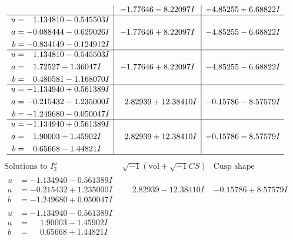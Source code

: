 \documentclass[1p]{elsarticle_modified}
\theoremstyle{definition}
\newcommand{\I}{\sqrt{-1}}
\begin{document}
$$\begin{array}{c|c|c}
 & -1.77646 - 8.22097 I & -4.85255 + 6.68822 I \\ \hline\begin{aligned}
u &= \phantom{-}1.134810 - 0.545503 I \\
a &= -0.088444 - 0.629026 I \\
b &= -0.834149 - 0.124912 I\end{aligned}
 & -1.77646 + 8.22097 I & -4.85255 - 6.68822 I \\ \hline\begin{aligned}
u &= \phantom{-}1.134810 - 0.545503 I \\
a &= \phantom{-}1.72527 + 1.36047 I \\
b &= \phantom{-}0.480581 - 1.168070 I\end{aligned}
 & -1.77646 + 8.22097 I & -4.85255 - 6.68822 I \\ \hline\begin{aligned}
u &= -1.134940 + 0.561389 I \\
a &= -0.215432 - 1.235000 I \\
b &= -1.249680 - 0.050047 I\end{aligned}
 & \phantom{-}2.82939 + 12.38410 I & -0.15786 - 8.57579 I \\ \hline\begin{aligned}
u &= -1.134940 + 0.561389 I \\
a &= \phantom{-}1.90003 + 1.45902 I \\
b &= \phantom{-}0.65668 - 1.44821 I\end{aligned}
 & \phantom{-}2.82939 + 12.38410 I & -0.15786 - 8.57579 I\\
 \hline 
 \end{array}$$\newpage$$\begin{array}{c|c|c}  
\text{Solutions to }I^u_{2}& \I (\text{vol} + \sqrt{-1}CS) & \text{Cusp shape}\\
 \hline 
\begin{aligned}
u &= -1.134940 - 0.561389 I \\
a &= -0.215432 + 1.235000 I \\
b &= -1.249680 + 0.050047 I\end{aligned}
 & \phantom{-}2.82939 - 12.38410 I & -0.15786 + 8.57579 I \\ \hline\begin{aligned}
u &= -1.134940 - 0.561389 I \\
a &= \phantom{-}1.90003 - 1.45902 I \\
b &= \phantom{-}0.65668 + 1.44821 I\end{aligned}

\end{array}$$
\end{document}

